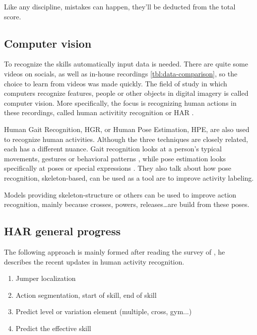 Like any discipline, mistakes can happen, they'll be deducted from the total score.

\subsection{Computer vision}
\label{subsec:computer vision}

To recognize the skills automatically input data is needed. There are quite some videos on socials, as well as in-house recordings \ref{tbl:data-comparison}, so the choice to learn from videos was made quickly. The field of study in which computers recognize features, people or other objects in digital imagery is called computer vision. More specifically, the focus is recognizing human actions in these recordings, called human activitity recognition or HAR \autocite{Pareek_2020}.

Human Gait Recognition, HGR, or Human Pose Estimation, HPE, are also used to recognize human activities. Although the three techniques are closely related, each has a different nuance. Gait recognition looks at a person's typical movements, gestures or behavioral patterns \autocite{Alharthi_2019}, while pose estimation looks specifically at poses or special expressions \autocite{Song_2021}. They also talk about how pose recognition, skeleton-based, can be used as a tool are to improve activity labeling.

Models providing skeleton-structure or others can be used to improve action recognition, mainly because crosses, powers, releases\dots are build from these poses.

\subsection{HAR general progress}

The following approach is mainly formed after reading the survey of \textcite{Pareek_2020}, he describes the recent updates in human activity recognition.

\begin{enumerate}
    \item Jumper localization
    \item Action segmentation, start of skill, end of skill
    \item Predict level or variation element (multiple, cross, gym...)
    \item Predict the effective skill
\end{enumerate}

